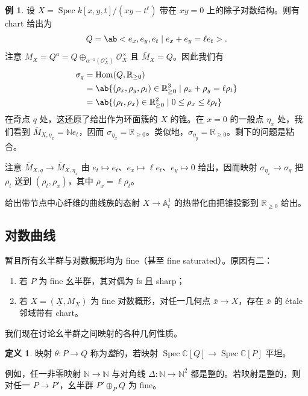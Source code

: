 \documentclass{amsart}
\theoremstyle{definition}
\newtheorem{defn}[thm]{定义}
\newtheorem{exm}[thm]{例}
\theoremstyle{remark}
\theoremstyle{plain}
\theoremstyle{definition}
\theoremstyle{remark}
\newcommand{\A}{\mathbb{A}}
\newcommand{\N}{\mathbb{N}}
\newcommand{\R}{\mathbb{R}}
\newcommand{\C}{\mathbb{C}}
\newcommand{\mc}[1]{\mathcal{#1}}
\newcommand{\ul}[1]{\underline{#1}}
\newcommand{\1}{\mathbf{1}}
\newcommand{\2}{\mathbf{2}}
\newcommand{\3}{\mathbf{3}}
\DeclareMathOperator{\Hom}{Hom}
\DeclareMathOperator{\Spec}{Spec}
\begin{document}
\begin{exm}
    设 \(X = \Spec k[x,y,t]/(xy-t^{\ell})\) 带在 \(xy = 0\) 上的除子对数结构。则有 chart 给出为
    \[ Q = \ab<e_x, e_y, e_t \mid e_x + e_y = \ell e_t>. \]
    注意 \(M_X = Q^a = Q \oplus_{\alpha^{-1}(\mc{O}_X^{\times})} \mc{O}_X^{\times}\) 且 \(\bar{M}_X = Q\)。因此我们有
    \begin{align*}
        \sigma_q &= \Hom(Q, \R_{\geq 0}) \\
        &= \ab\{ (\rho_x, \rho_y, \rho_t) \in \R_{\geq 0}^3 \mid \rho_x + \rho_y = \ell \rho_t \} \\
        &= \ab\{ (\rho_t, \rho_x) \in \R_{\geq 0}^2 \mid 0 \leq \rho_x \leq \ell \rho_t \}
    \end{align*}
    在奇点 \(q\) 处，这还原了给出作为环面簇的 \(X\) 的锥。在 \(x = 0\) 的一般点 \(\eta_x\) 处，我们看到 \(\bar{M}_{X, \eta_x} = \N e_t\)，因而 \(\sigma_{\eta_x} = \R_{\geq 0}\)。类似地，\(\sigma_{\eta_y} = \R_{\geq 0}\)。剩下的问题是粘合。

    注意 \(\bar{M}_{X, q} \to \bar{M}_{X, \eta_x}\) 由 \(e_t \mapsto e_t\)、\(e_x \mapsto \ell e_t\)、\(e_y \mapsto 0\) 给出，因而映射 \(\sigma_{\eta_x} \to \sigma_q\) 把 \(\rho_t\) 送到 \((\rho_t, \rho_x)\)，其中 \(\rho_x = \ell \rho_t\)。

    给出带节点中心纤维的曲线族的态射 \(X \to \A^1_t\) 的热带化由把锥投影到 \(\R_{\geq 0}\) 给出。
\end{exm}


\subsection{对数曲线}%
\label{sub:Log curves}

暂且所有幺半群与对数概形均为 fine（甚至 fine saturated）。原因有二：
\begin{enumerate}
    \item 若 \(P\) 为 fine 幺半群，其对偶为 fs 且 sharp；
    \item 若 \(X = (\ul{X}, M_X)\) 为 fine 对数概形，对任一几何点 \(\bar{x} \to X\)，存在 \(\bar{x}\) 的 \'etale 邻域带有 chart。
\end{enumerate}

我们现在讨论幺半群之间映射的各种几何性质。
\begin{defn}
    映射 \(\theta \colon P \to Q\) 称为\textit{整}的，若映射 \(\Spec\C[Q] \to \Spec \C[P]\) 平坦。
\end{defn}

例如，任一非零映射 \(\N \to \N\) 与对角线 \(\Delta \colon\N \to \N^2\) 都是整的。若映射是整的，则对任一 \(P \to P'\)，幺半群 \(P' \oplus_P Q\) 为 fine。
\end{document}
